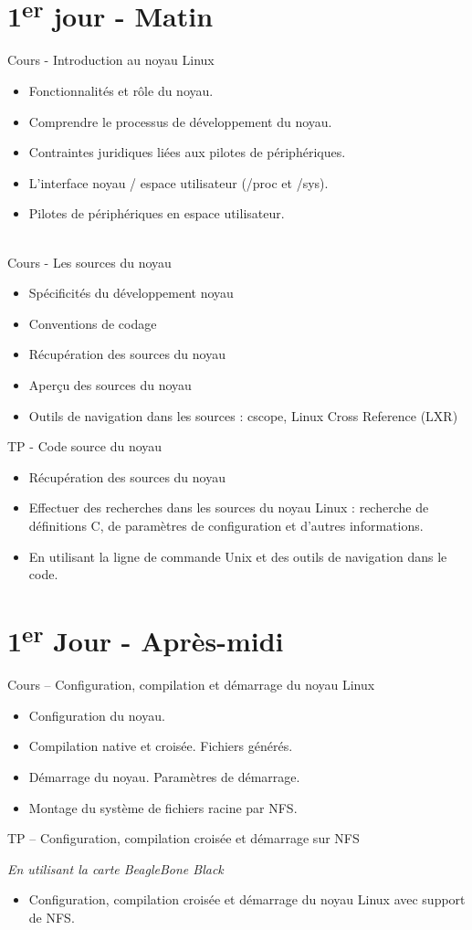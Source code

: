 \documentclass[a4paper,12pt,obeyspaces,spaces,hyphens]{article}
\begin{document}
\section{1\textsuperscript{er} jour - Matin}

\feagendaonecolumn
{Cours - Introduction au noyau Linux}
{
  \begin{itemize}
  \item Fonctionnalités et rôle du noyau.
  \item Comprendre le processus de développement du noyau.
  \item Contraintes juridiques liées aux pilotes de périphériques.
  \item L'interface noyau / espace utilisateur (/proc et /sys).
  \item Pilotes de périphériques en espace utilisateur.
  \end{itemize}
}
\\
\feagendatwocolumn
{Cours - Les sources du noyau}
{
  \begin{itemize}
  \item Spécificités du développement noyau
  \item Conventions de codage
  \item Récupération des sources du noyau
  \item Aperçu des sources du noyau
  \item Outils de navigation dans les sources : cscope, Linux Cross
    Reference (LXR)
  \end{itemize}
}
{TP - Code source du noyau}
{
  \begin{itemize}
  \item Récupération des sources du noyau
  \item Effectuer des recherches dans les sources du noyau Linux :
    recherche de définitions C, de paramètres de configuration et d'autres
    informations.
  \item En utilisant la ligne de commande Unix et des outils de
    navigation dans le code.
 \end{itemize}
}

\section{1\textsuperscript{er} Jour - Après-midi}
\feagendatwocolumn
{Cours – Configuration, compilation et démarrage du noyau Linux}
{
  \begin{itemize}
  \item Configuration du noyau.
  \item Compilation native et croisée. Fichiers générés.
  \item Démarrage du noyau. Paramètres de démarrage.
  \item Montage du système de fichiers racine par NFS.
  \end{itemize}
}
{TP – Configuration, compilation croisée et démarrage sur NFS}
{
  {\em En utilisant la carte BeagleBone Black}
  \begin{itemize}
  \item Configuration, compilation croisée et démarrage du noyau Linux
    avec support de NFS.
  \end{itemize}
}
\\
\end{document}
